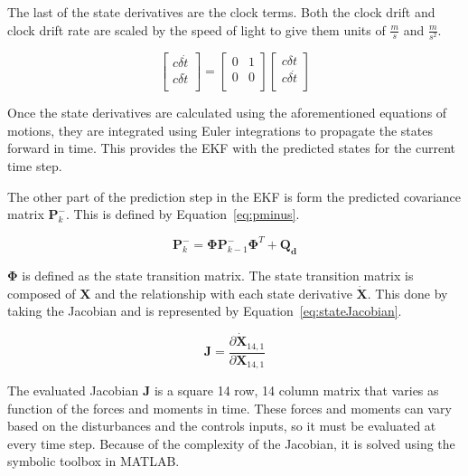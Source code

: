 The last of the state derivatives are the clock terms. Both the clock drift and clock drift rate are scaled by the speed of light to give them units of \(\frac{m}{s}\) and \(\frac{m}{s^2}\).

\begin{equation}\label{eq:clkRates}
    \begin{bmatrix}
        c\delta \dot{t} \\
        c\delta\ddot{t} \\
    \end{bmatrix} =
    \begin{bmatrix}
        0 & 1 \\
        0 & 0 \\
    \end{bmatrix}
    \begin{bmatrix}
        c\delta {t}    \\
        c\delta\dot{t} \\
    \end{bmatrix}
\end{equation}

Once the state derivatives are calculated using the aforementioned equations of motions, they are integrated using Euler integrations to propagate the states forward in time. This provides the EKF with the predicted states for the current time step.

The other part of the prediction step in the EKF is form the predicted covariance matrix \(\mathbf{P}^-_{k}\). This is defined by Equation~\ref{eq:pminus}.

\begin{equation}\label{eq:pminus}
    \mathbf{P}^-_{k} = \mathbf{\Phi}\mathbf{P}^-_{k-1} \mathbf{\Phi}^T + \mathbf{Q_d}
\end{equation}

\( \mathbf{\Phi}\) is defined as the state transition matrix. The state transition matrix is composed of \(\mathbf{X}\) and the relationship with each state derivative \( \dot{\mathbf{X}}\). This done by taking the Jacobian and is represented by Equation~\ref{eq:stateJacobian}.

\begin{equation}\label{eq:stateJacobian}
    \mathbf{J} = \frac{\partial \dot{\mathbf{X}}_{14,1}}{\partial \mathbf{X}_{14,1}}
\end{equation}

The evaluated Jacobian \(\mathbf{J}\) is a square 14 row, 14 column matrix that varies as function of the forces and moments in time. These forces and moments can vary based on the disturbances and the controls inputs, so it must be evaluated at every time step. Because of the complexity of the Jacobian, it is solved using the symbolic toolbox in MATLAB.

